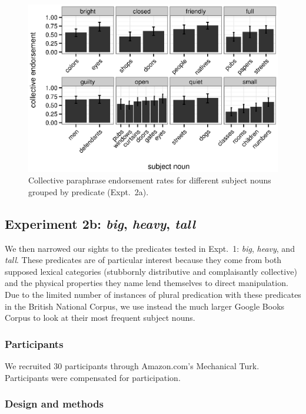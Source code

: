 \documentclass[linguex]{sp}
\begin{document}
\begin{figure}[h!]
	\centering
	\includegraphics[width=.85\linewidth]{plots/noun_pred_plot.eps}
	\caption{Collective paraphrase endorsement rates for different subject nouns grouped by predicate (Expt.~2a).} \label{noun-pred-coll}
\end{figure}


\subsection{Experiment 2b: \emph{big}, \emph{heavy}, \emph{tall}}

We then narrowed our sights to the predicates tested in Expt.~1: \emph{big}, \emph{heavy}, and \emph{tall}. These predicates are of particular interest because they come from both supposed lexical categories (stubbornly distributive and complaisantly collective) and the physical properties they name lend themselves to direct manipulation.
Due to the limited number of instances of plural predication with these predicates in the British National Corpus, we use instead the much larger Google Books Corpus \citep{davies2011} to look at their most frequent subject nouns.

\subsubsection{Participants}

We recruited 30 participants through Amazon.com's Mechanical Turk. Participants were compensated for participation.

\subsubsection{Design and methods}
\end{document}
